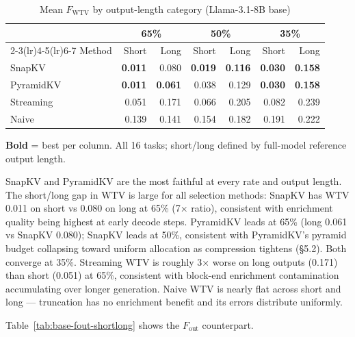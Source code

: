 \documentclass[10pt,letterpaper]{article}
\begin{document}
\begin{table}[H]
\centering
\small
\captionsetup{justification=centering}
\caption{Mean \(F_{\text{WTV}}\) by output-length category (Llama-3.1-8B base)}
\label{tab:base-wtv-shortlong}
\begin{tabular}{@{}lrrrrrr@{}}
\toprule
& \multicolumn{2}{c}{65\%} & \multicolumn{2}{c}{50\%} & \multicolumn{2}{c}{35\%}\\
\cmidrule(lr){2-3}\cmidrule(lr){4-5}\cmidrule(lr){6-7}
Method & Short & Long & Short & Long & Short & Long\\
\midrule
SnapKV    & \textbf{0.011} & 0.080 & \textbf{0.019} & \textbf{0.116} & \textbf{0.030} & \textbf{0.158}\\
PyramidKV & \textbf{0.011} & \textbf{0.061} & 0.038 & 0.129 & \textbf{0.030} & \textbf{0.158}\\
Streaming & 0.051 & 0.171 & 0.066 & 0.205 & 0.082 & 0.239\\
Naive     & 0.139 & 0.141 & 0.154 & 0.182 & 0.191 & 0.222\\
\bottomrule
\end{tabular}
\center\smallskip
\textbf{Bold} = best per column.
All 16 tasks; short/long defined by full-model reference output length.
\end{table}

SnapKV and PyramidKV are the most faithful at every rate and output length.
The short/long gap in WTV is large for all selection methods: SnapKV has WTV
0.011 on short vs 0.080 on long at 65\% (7× ratio), consistent with enrichment quality being highest at early decode steps.
PyramidKV leads at 65\% (long 0.061 vs SnapKV 0.080);
SnapKV leads at 50\%, consistent with PyramidKV's pyramid budget collapsing
toward uniform allocation as compression tightens (§5.2). Both converge at 35\%.
Streaming WTV is roughly 3× worse on long outputs (0.171) than short (0.051)
at 65\%, consistent with block-end enrichment contamination accumulating over
longer generation. Naive WTV is nearly flat across short and long --- truncation
has no enrichment benefit and its errors distribute uniformly.

Table~\ref{tab:base-fout-shortlong} shows the \(F_{\text{out}}\) counterpart.
\end{document}
